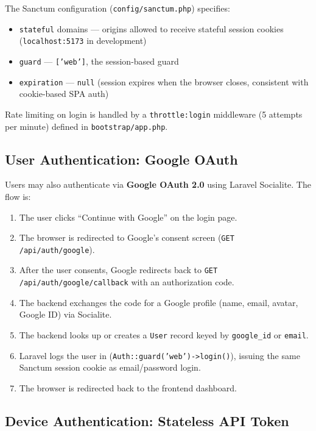 \documentclass[11pt,a4paper]{article}
\begin{document}
The Sanctum configuration (\texttt{config/sanctum.php}) specifies:
\begin{itemize}
    \item \texttt{stateful} domains --- origins allowed to receive stateful session cookies (\texttt{localhost:5173} in development)
    \item \texttt{guard} --- \texttt{['web']}, the session-based guard
    \item \texttt{expiration} --- \texttt{null} (session expires when the browser closes, consistent with cookie-based SPA auth)
\end{itemize}

Rate limiting on login is handled by a \texttt{throttle:login} middleware (5 attempts per minute) defined in \texttt{bootstrap/app.php}.

\subsection{User Authentication: Google OAuth}

Users may also authenticate via \textbf{Google OAuth 2.0} using Laravel Socialite. The flow is:

\begin{enumerate}[leftmargin=*]
    \item The user clicks ``Continue with Google'' on the login page.
    \item The browser is redirected to Google's consent screen (\texttt{GET /api/auth/google}).
    \item After the user consents, Google redirects back to \texttt{GET /api/auth/google/callback} with an authorization code.
    \item The backend exchanges the code for a Google profile (name, email, avatar, Google ID) via Socialite.
    \item The backend looks up or creates a \texttt{User} record keyed by \texttt{google\_id} or \texttt{email}.
    \item Laravel logs the user in (\texttt{Auth::guard('web')->login()}), issuing the same Sanctum session cookie as email/password login.
    \item The browser is redirected back to the frontend dashboard.
\end{enumerate}

\subsection{Device Authentication: Stateless API Token}
\end{document}

